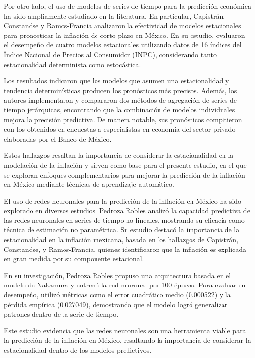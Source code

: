 \documentclass[12pt,letterpaper]{article}
\begin{document}
Por otro lado, el uso de modelos de series de tiempo para la predicción económica ha sido ampliamente estudiado en la literatura. En particular, Capistrán, Constandse y Ramos-Francia \cite{capistran2009uso} analizaron la efectividad de modelos estacionales para pronosticar la inflación de corto plazo en México. En su estudio, evaluaron el desempeño de cuatro modelos estacionales utilizando datos de 16 índices del Índice Nacional de Precios al Consumidor (INPC), considerando tanto estacionalidad determinista como estocástica.

Los resultados indicaron que los modelos que asumen una estacionalidad y tendencia determinísticas producen los pronósticos más precisos. Además, los autores implementaron y compararon dos métodos de agregación de series de tiempo jerárquicas, encontrando que la combinación de modelos individuales mejora la precisión predictiva. De manera notable, sus pronósticos compitieron con los obtenidos en encuestas a especialistas en economía del sector privado elaboradas por el Banco de México.

Estos hallazgos resaltan la importancia de considerar la estacionalidad en la modelación de la inflación y sirven como base para el presente estudio, en el que se exploran enfoques complementarios para mejorar la predicción de la inflación en México mediante técnicas de aprendizaje automático.

El uso de redes neuronales para la predicción de la inflación en México ha sido explorado en diversos estudios. Pedroza Robles \cite{robles2019uso} analizó la capacidad predictiva de las redes neuronales en series de tiempo no lineales, mostrando su eficacia como técnica de estimación no paramétrica. Su estudio destacó la importancia de la estacionalidad en la inflación mexicana, basada en los hallazgos de Capistrán, Constandse, y Ramos-Francia\cite{capistran2009uso}, quienes identificaron que la inflación es explicada en gran medida por su componente estacional.

En su investigación, Pedroza Robles propuso una arquitectura basada en el modelo de Nakamura \cite{nakamura2005inflation} y entrenó la red neuronal por 100 épocas. Para evaluar su desempeño, utilizó métricas como el error cuadrático medio (0.000522) y la pérdida empírica (0.027049), demostrando que el modelo logró generalizar patrones dentro de la serie de tiempo.

Este estudio evidencia que las redes neuronales son una herramienta viable para la predicción de la inflación en México, resaltando la importancia de considerar la estacionalidad dentro de los modelos predictivos.
\end{document}
